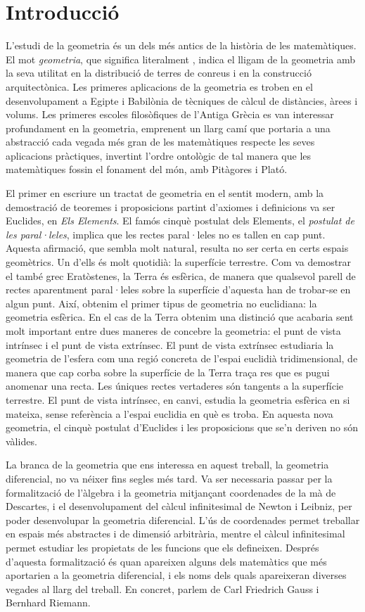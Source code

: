 \chapter{Introducci\'o}
L'estudi de la geometria és un dels més antics de la història de les matemàtiques. El mot \textit{geometria}, que significa literalment , indica el lligam de la geometria amb la seva utilitat en la distribució de terres de conreus i en la construcció arquitectònica. Les primeres aplicacions de la geometria es troben en el desenvolupament a Egipte i Babilònia de tècniques de càlcul de distàncies, àrees i volums. Les primeres escoles filosòfiques de l'Antiga Grècia es van interessar profundament en la geometria, emprenent un llarg camí que portaria a una abstracció cada vegada més gran de les matemàtiques respecte les seves aplicacions pràctiques, invertint l'ordre ontològic de tal manera que les matemàtiques fossin el fonament del món, amb Pitàgores i Plató.

El primer en escriure un tractat de geometria en el sentit modern, amb la demostració de teoremes i proposicions partint d'axiomes i definicions va ser Euclides, en \textit{Els Elements}. El famós cinquè postulat dels Elements, el \textit{postulat de les paral·leles}, implica que les rectes paral·leles no es tallen en cap punt. Aquesta afirmació, que sembla molt natural, resulta no ser certa en certs espais geomètrics. Un d'ells és molt quotidià: la superfície terrestre. Com va demostrar el també grec Eratòstenes, la Terra és esfèrica, de manera que qualsevol parell de rectes aparentment paral·leles sobre la superfície d'aquesta han de trobar-se en algun punt. Així, obtenim el primer tipus de geometria no euclidiana: la geometria esfèrica. En el cas de la Terra obtenim una distinció que acabaria sent molt important entre dues maneres de concebre la geometria: el punt de vista intrínsec i el punt de vista extrínsec. El punt de vista extrínsec estudiaria la geometria de l'esfera com una regió concreta de l'espai euclidià tridimensional, de manera que cap corba sobre la superfície de la Terra traça res que es pugui anomenar una recta. Les úniques rectes vertaderes són tangents a la superfície terrestre. El punt de vista intrínsec, en canvi, estudia la geometria esfèrica en si mateixa, sense referència a l'espai euclidia en què es troba. En aquesta nova geometria, el cinquè postulat d'Euclides i les proposicions que se'n deriven no són vàlides.

La branca de la geometria que ens interessa en aquest treball, la geometria diferencial, no va néixer fins segles més tard. Va ser necessaria passar per la formalització de l'àlgebra i la geometria mitjançant coordenades de la mà de Descartes, i el desenvolupament del càlcul infinitesimal de Newton i Leibniz, per poder desenvolupar la geometria diferencial. L'ús de coordenades permet treballar en espais més abstractes i de dimensió arbitrària, mentre el càlcul infinitesimal permet estudiar les propietats de les funcions que els defineixen. Després d'aquesta formalització és quan apareixen alguns dels matemàtics que més aportarien a la geometria diferencial, i els noms dels quals apareixeran diverses vegades al llarg del treball. En concret, parlem de Carl Friedrich Gauss i Bernhard Riemann.

